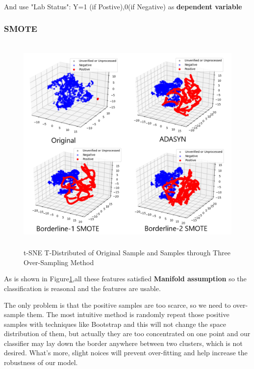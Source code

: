 \documentclass[12pt]{article}
\begin{document}
And use "Lab Status": Y=1 (if Postive),0(if Negative) as \textbf{dependent variable}



\subsubsection{SMOTE}
\begin{figure}[H]
	\small
	\label{u=tsne}
	\centering
	\includegraphics[width=13cm,height=11cm]{./pictures/tsne.png}
	\caption{t-SNE T-Distributed of Original Sample and Samples through Three Over-Sampling Method}\protect\footnotemark[1] 
\end{figure}

As is shown in Figure\protect\ref{u=tsne},all these features satisfied \textbf{Manifold assumption} so the classification is reasonal and the features are usable.

The only problem is that the positive samples are too scarce, so we need to over-sample them. The most intuitive method is randomly repeat those positive samples with techniques like Bootstrap and this will not change the space distribution of them, but actually they are too concentrated on one point and our classifier may lay down the border anywhere between two clusters, which is not desired. What's more, slight noices will prevent over-fitting and help increase the robustness of our model.
\end{document}
